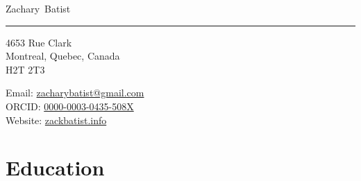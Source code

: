\documentclass[11pt, a4paper]{article}
\makeatletter
\newcommand{\TORINF}{Faculty of Information}
\newcommand{\TOR}{University of Toronto}
\newcommand{\Address}{4653 Rue Clark \\ Montreal, Quebec, Canada \\ H2T 2T3}
\newcommand{\Affiliation}{\TORINF \\ \TOR}
\newcommand{\FirstName}{Zachary}
\newcommand{\LastName}{Batist}
\newcommand{\MyName}{\FirstName\ \LastName}
\newcommand{\Email}{zacharybatist@gmail.com}
\newcommand{\PersonalWebsite}{zackbatist.info}
\newcommand{\MyGitHub}{zackbatist}
\newcommand{\Twitter}{@mtl\_zack}
\newcommand{\Mastodon}{archaeo.social/@zackbatist}
\newcommand{\ORCID}{0000-0003-0435-508X}
\newcommand{\Duration}[2]{\fontsize{10pt}{0}\selectfont #1 -- #2}
\newcommand{\Ongoing}{present}
\newcommand{\Appointment}[4]{\textbf{#1} \newline #2 \newline #3 \newline #4}
\makeatother
\begin{document}
\thispagestyle{empty}

{\fontsize{22pt}{0}\selectfont\MyName}\\[-0.1cm]
\rule{\textwidth}{0.2pt}
\begin{minipage}[t]{0.595\textwidth}
  \Address
\end{minipage}
\begin{minipage}[t]{0.405\textwidth}
  \begin{flushright}
    Email: \href{mailto:\Email}{\Email}
    \\
    ORCID: \href{https://orcid.org/\ORCID}{\ORCID}
    \\
    Website: \href{https://\PersonalWebsite}{\PersonalWebsite}
    \\
  \end{flushright}
\end{minipage}



\section{Education}
\end{document}
